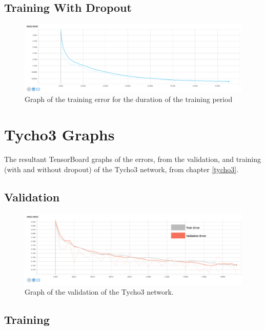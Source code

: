 \documentclass[12pt,a4paper,oneside,oldfontcommands]{memoir}
\begin{document}
\begin{Declaration Of OriginalityOrginality}
\section{Training With Dropout}

\begin{figure}[H]
  \centering
    \includegraphics[width=\linewidth]{graphs/D/tycho_2_TRAIN_CONCAT_ADAM_0004_relu_relu_05.png}
    \caption{Graph of the training error for the duration of the training period}
\end{figure}


\chapter{Tycho3 Graphs}

The resultant TensorBoard graphs of the errors, from the validation, and training (with and without dropout) of the Tycho3 network, from chapter \ref{tycho3}.

\section{Validation}

\begin{figure}[H]
  \centering
    \includegraphics[width=\linewidth]{graphs/E/tycho_2_experiments_ADAM_0004_maxout_relu.png}
    \caption{Graph of the validation of the Tycho3 network.}
\end{figure}

\section{Training}


\end{Declaration Of OriginalityOrginality}
\end{document}
